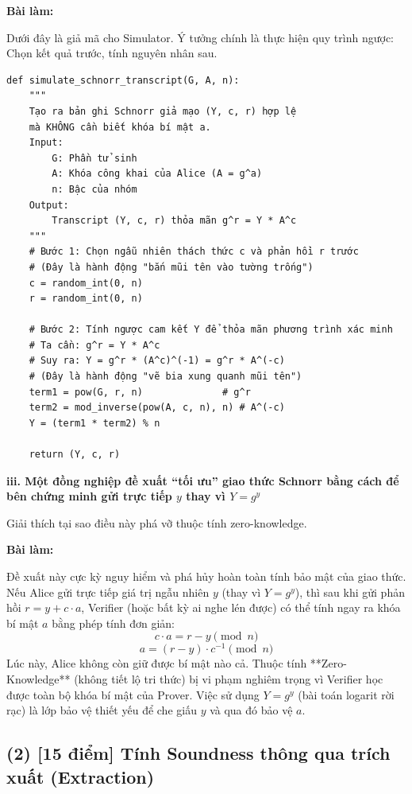 \textbf{Bài làm:}

Dưới đây là giả mã cho Simulator. Ý tưởng chính là thực hiện quy trình ngược: Chọn kết quả trước, tính nguyên nhân sau.

\begin{verbatim}
def simulate_schnorr_transcript(G, A, n):
    """
    Tạo ra bản ghi Schnorr giả mạo (Y, c, r) hợp lệ
    mà KHÔNG cần biết khóa bí mật a.
    Input:
        G: Phần tử sinh
        A: Khóa công khai của Alice (A = g^a)
        n: Bậc của nhóm
    Output:
        Transcript (Y, c, r) thỏa mãn g^r = Y * A^c
    """
    # Bước 1: Chọn ngẫu nhiên thách thức c và phản hồi r trước
    # (Đây là hành động "bắn mũi tên vào tường trống")
    c = random_int(0, n)
    r = random_int(0, n)
    
    # Bước 2: Tính ngược cam kết Y để thỏa mãn phương trình xác minh
    # Ta cần: g^r = Y * A^c
    # Suy ra: Y = g^r * (A^c)^(-1) = g^r * A^(-c)
    # (Đây là hành động "vẽ bia xung quanh mũi tên")
    term1 = pow(G, r, n)              # g^r
    term2 = mod_inverse(pow(A, c, n), n) # A^(-c)
    Y = (term1 * term2) % n
    
    return (Y, c, r)
\end{verbatim}

\textbf{iii. Một đồng nghiệp đề xuất ``tối ưu'' giao thức Schnorr bằng cách để bên chứng minh gửi trực tiếp $y$ thay vì $Y = g^y$}

Giải thích tại sao điều này phá vỡ thuộc tính zero-knowledge.

\textbf{Bài làm:}

Đề xuất này cực kỳ nguy hiểm và phá hủy hoàn toàn tính bảo mật của giao thức.
Nếu Alice gửi trực tiếp giá trị ngẫu nhiên $y$ (thay vì $Y = g^y$), thì sau khi gửi phản hồi $r = y + c \cdot a$, Verifier (hoặc bất kỳ ai nghe lén được) có thể tính ngay ra khóa bí mật $a$ bằng phép tính đơn giản:
\[
c \cdot a = r - y \pmod{n}
\]
\[
a = (r - y) \cdot c^{-1} \pmod{n}
\]
Lúc này, Alice không còn giữ được bí mật nào cả. Thuộc tính **Zero-Knowledge** (không tiết lộ tri thức) bị vi phạm nghiêm trọng vì Verifier học được toàn bộ khóa bí mật của Prover. Việc sử dụng $Y = g^y$ (bài toán logarit rời rạc) là lớp bảo vệ thiết yếu để che giấu $y$ và qua đó bảo vệ $a$.

\vspace{0.5cm}

\subsection{(2) [15 điểm] Tính Soundness thông qua trích xuất (Extraction)}

